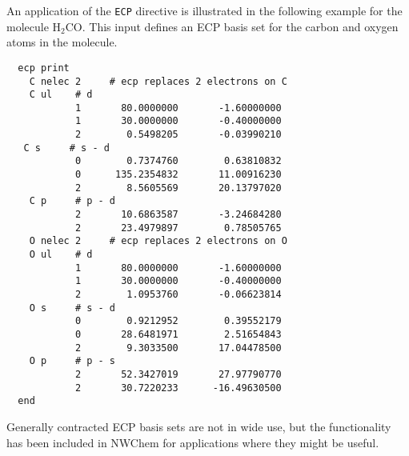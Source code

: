 An application of the \verb+ECP+ directive is illustrated in the following 
example for the molecule  H$_2$CO.  This input defines an ECP basis set 
for the  carbon and oxygen atoms in the molecule.


\begin{verbatim}
  ecp print  
    C nelec 2     # ecp replaces 2 electrons on C
    C ul    # d
            1       80.0000000       -1.60000000
            1       30.0000000       -0.40000000
            2        0.5498205       -0.03990210
   C s     # s - d 
            0        0.7374760        0.63810832
            0      135.2354832       11.00916230
            2        8.5605569       20.13797020
    C p     # p - d
            2       10.6863587       -3.24684280
            2       23.4979897        0.78505765
    O nelec 2     # ecp replaces 2 electrons on O
    O ul    # d 
            1       80.0000000       -1.60000000
            1       30.0000000       -0.40000000
            2        1.0953760       -0.06623814
    O s     # s - d
            0        0.9212952        0.39552179
            0       28.6481971        2.51654843
            2        9.3033500       17.04478500
    O p     # p - s 
            2       52.3427019       27.97790770
            2       30.7220233      -16.49630500
  end
\end{verbatim}

Generally contracted ECP basis sets are not in wide use, but the
functionality has been included in NWChem for applications where they
might be useful. 

